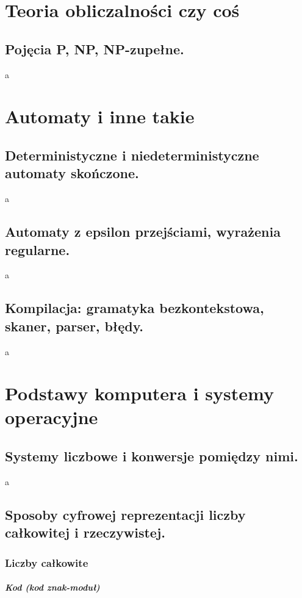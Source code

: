 \documentclass[a4paper,12pt,oneside]{book}
\begin{document}
		\newpage\section{Teoria obliczalności czy coś}
			\subsection{\color{red}Pojęcia P, NP, NP-zupełne.}
				a
		
		\newpage\section{Automaty i inne takie}
			\subsection{\color{red}Deterministyczne i niedeterministyczne automaty skończone.}
				a
			\newpage\subsection{\color{red}Automaty z epsilon przejściami, wyrażenia regularne.}
				a
			\newpage\subsection{\color{red}Kompilacja: gramatyka bezkontekstowa, skaner, parser, błędy.}
				a
		
		\newpage\section{Podstawy komputera i systemy operacyjne}
			\subsection{\color{red}Systemy liczbowe i konwersje pomiędzy nimi.}
			
				a
				
			\newpage\subsection{Sposoby cyfrowej reprezentacji liczby całkowitej i rzeczywistej.}
			
				\subsubsection{Liczby całkowite}
				
				\subparagraph{Kod  (kod znak-moduł)}
				
\end{document}
